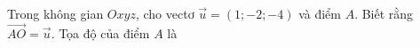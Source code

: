 \begin{ex}
Trong không gian $Oxyz$, cho vectơ $\vec u=(1;-2;-4)$ và điểm $A$. Biết rằng $\overrightarrow{AO}=\vec u$. Tọa độ của điểm $A$ là
\end{ex}

